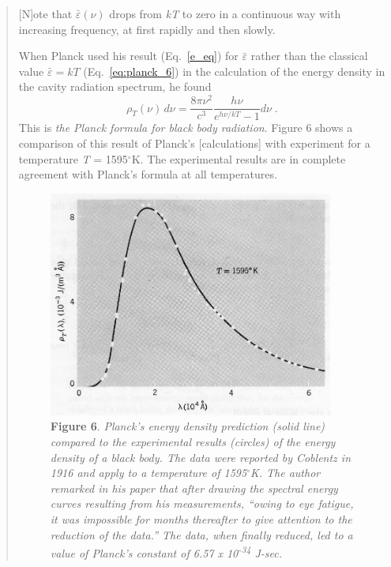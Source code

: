 \begin{quotation}
{[}N{]}ote that $\bar{\varepsilon}(\nu)$ drops from \emph{kT} to zero in a continuous
way with increasing frequency, at first rapidly and then slowly.

When Planck used his result (Eq.~\ref{e_eq}) for $\bar{\varepsilon}$ rather than the classical value
$\bar{\varepsilon} = kT$ (Eq.~\ref{eq:planck_6}) in the calculation of the energy density in the
cavity radiation spectrum, he found
\begin{equation}\label{eq:planck_12}
\rho_T(\nu)\, d\nu = \frac{8\pi\nu^2}{c^3} \frac{h\nu}{e^{h\nu/kT}-1} d\nu \; . %
\end{equation}
This is \emph{the Planck formula for black body radiation}. Figure 6
shows a comparison of this result of Planck's {[}calculations{]} with
experiment for a temperature \emph{T} = 1595$^\circ$K. The experimental results
are in complete agreement with Planck's formula at all temperatures.

%
\begin{figure}[h]
  \begin{center}
  \captionsetup{width=4.6875in}
  \includegraphics[width=3.6875in,height=2.92708in]{images/05_planck/image037.jpg}
  \caption*{\textbf{Figure 6}. \emph{Planck's energy density prediction (solid line)
    compared to the experimental results (circles) of the energy density of
    a black body. The data were reported by Coblentz in 1916 and apply to a
    temperature of 1595$^\circ$K. The author remarked in his paper that after
    drawing the spectral energy curves resulting from his measurements,
    ``owing to eye fatigue, it was impossible for months thereafter to give
    attention to the reduction of the data.'' The data, when finally
    reduced, led to a value of Planck's constant of 6.57 x
    10\textsuperscript{-34} J-sec.}}
  \end{center}
\end{figure}
\end{quotation}

